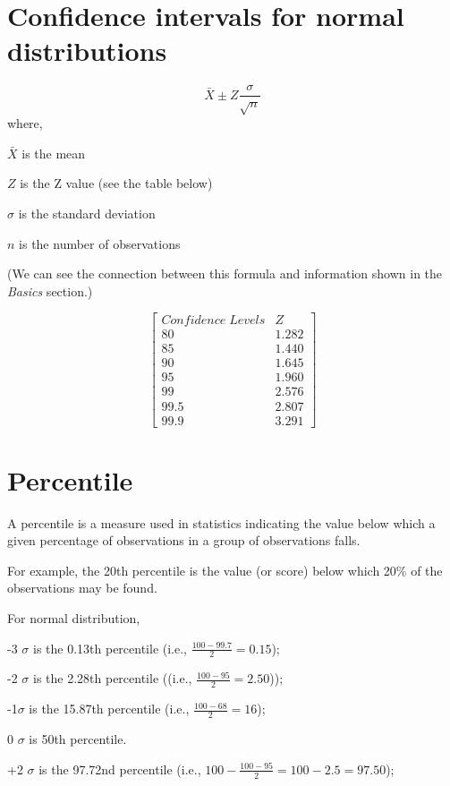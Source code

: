 \documentclass[]{book}
\begin{document}
\hypertarget{confidence-intervals-for-normal-distributions}{%
\section{Confidence intervals for normal distributions}\label{confidence-intervals-for-normal-distributions}}

\[\bar{X} \pm Z \frac{\sigma}{\sqrt{n}}\]
where,

\(\bar{X}\) is the mean

\(Z\) is the Z value (see the table below)

\(\sigma\) is the standard deviation

\(n\) is the number of observations

(We can see the connection between this formula and information shown in the \emph{Basics} section.)

\[\begin{bmatrix}
Confidence \; Levels & Z \\
80  & 1.282 \\
85 & 1.440 \\
90 & 1.645 \\
95 & 1.960 \\
99 & 2.576 \\
99.5 & 2.807 \\
99.9 & 3.291 \end{bmatrix}\]

\hypertarget{percentile}{%
\section{Percentile}\label{percentile}}

A percentile is a measure used in statistics indicating the value below which a given percentage of observations in a group of observations falls.

For example, the 20th percentile is the value (or score) below which 20\% of the observations may be found.

For normal distribution,

-3 \(\sigma\) is the 0.13th percentile (i.e., \(\frac{100-99.7}{2}=0.15\));

-2 \(\sigma\) is the 2.28th percentile ((i.e., \(\frac{100-95}{2}=2.50\)));

-1\(\sigma\) is the 15.87th percentile (i.e., \(\frac{100-68}{2}=16\));

0 \(\sigma\) is 50th percentile.

+2 \(\sigma\) is the 97.72nd percentile (i.e., \(100-\frac{100-95}{2}=100-2.5=97.50\));
\end{document}
